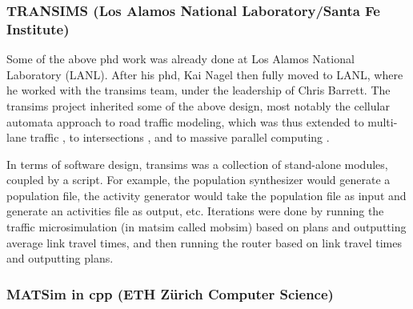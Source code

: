 \subsubsection{TRANSIMS (Los Alamos National Laboratory/Santa Fe Institute)}
\label{sec:history-lanl-phase}
Some of the above \acrshort{phd} work was already done at Los Alamos National Laboratory (LANL).  After his \acrshort{phd}, Kai Nagel then fully moved to LANL, where he worked with the \gls{transims} \citep[see, e.g.,][]{SmithEtc1995TRANSIMSSeattle} team, under the leadership of Chris Barrett.
%
The \gls{transims} project inherited some of the above design, most notably the cellular automata approach to road traffic modeling, which was thus extended to multi-lane traffic \citep{NagelWolfEtAl1998TwoLaneSystematic}, to intersections \citep{NagelEtc1997flow-char}, and to massive parallel computing \citep{NagelRickert2001parallel}.


In terms of software design, \gls{transims} was a collection of stand-alone modules, coupled by a script.  For example, the population synthesizer would generate a population file, the activity generator would take the population file as input and generate an activities file as output, etc.  Iterations were done by running 
the traffic \gls{microsimulation} (in \gls{matsim} called \gls{mobsim})
based on plans and outputting average link travel times, and then running the router based on link travel times and outputting plans.

\subsubsection{MATSim in \protect\gls{cpp} (ETH Zürich Computer Science)}
\label{sec:history-ethz-phase}

